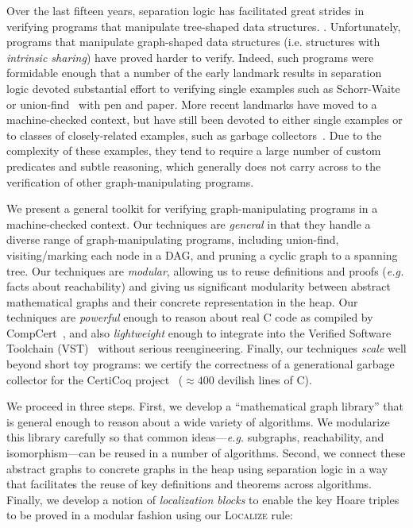 Over the last fifteen years, separation logic has facilitated great strides 
in verifying programs that manipulate tree-shaped data structures. 
\citep{berdine:smallfoot,chin:hipsleek,jacobs:verifast,
chlipala:bedrock,bengtson:charge,appel:programlogics}. 
Unfortunately, programs that manipulate graph-shaped data structures 
(i.e. structures with \emph{intrinsic sharing}) have proved harder to verify.  
Indeed, such programs were formidable enough that a number of the early 
landmark results in separation logic devoted substantial effort to verifying 
single examples such as Schorr-Waite~\cite{hongseok:phd} or 
union-find~\cite{neelthesis} with pen and paper.  
More recent landmarks have moved to a machine-checked context, but have still
been devoted to either single examples or to classes of closely-related examples, 
such as garbage collectors~\cite{blah,cakemlgc}.
Due to the complexity of these examples, they tend to require a large number 
of custom predicates and subtle reasoning, which generally does not carry across 
to the verification of other graph-manipulating programs.

We present a general toolkit for verifying graph-manipulating programs in a 
machine-checked context. Our techniques are \emph{general} in that they handle a diverse 
range of graph-manipulating programs, {\color{magenta}including union-find, visiting/marking 
each node in a DAG, and pruning a cyclic graph to a spanning tree.} 
Our techniques are \emph{modular}, allowing us to reuse definitions and proofs 
(\emph{e.g.} facts about reachability) and giving us {\color{magenta} significant 
modularity} between abstract mathematical graphs and their concrete representation 
in the heap.
Our techniques are \emph{powerful} enough to reason about real C code as compiled by 
CompCert~\cite{blah}, and also \emph{lightweight} enough to integrate into the Verified 
Software Toolchain (VST)~\cite{appel:programlogics} without serious reengineering.
Finally, our techniques \emph{scale} well beyond short toy programs: we certify the 
correctness of a generational garbage collector for the CertiCoq project~\cite{blah} 
($\approx400$ devilish lines of C).

We proceed in three steps. First, we develop a ``mathematical graph library'' that is general enough to reason about a wide variety of algorithms.  We modularize this library carefully so that common ideas---\emph{e.g.} subgraphs, reachability, and isomorphism---can be reused in a number of algorithms.  
Second, we connect these abstract graphs to
concrete graphs in the heap using separation logic in a way that facilitates the reuse of key definitions and theorems across algorithms.  Finally, we develop a notion of \emph{localization blocks} to
enable the key Hoare triples to be proved in a modular fashion using our \textsc{Localize}
rule:

